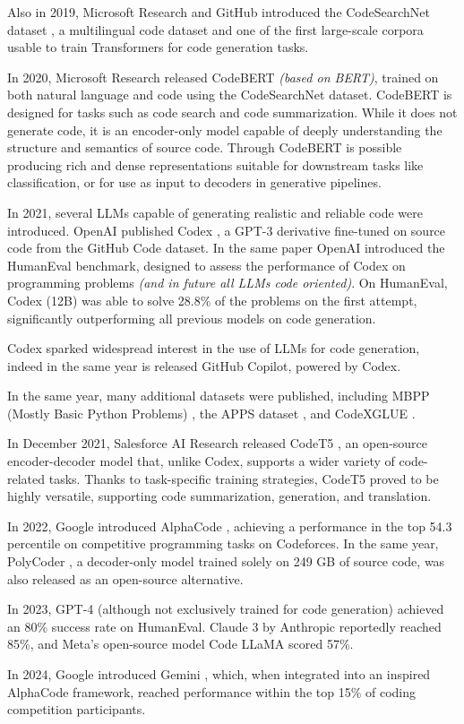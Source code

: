 Also in 2019, Microsoft Research and GitHub introduced the 
CodeSearchNet dataset \cite{husain2019codesearchnet}, a 
multilingual code dataset and one of the first large-scale 
corpora usable to train Transformers for code generation tasks.

In 2020, Microsoft Research released CodeBERT 
\cite{feng2020codebert} \textit{(based on BERT)}, 
trained on both natural 
language and code using the CodeSearchNet dataset. 
CodeBERT is designed for tasks such as code search 
and code summarization. While it does not generate code, 
it is an encoder-only model capable of deeply understanding 
the structure and semantics of source code. Through 
CodeBERT is possible producing rich 
and dense representations suitable for downstream tasks like 
classification, or for use as input to decoders in generative 
pipelines.

In 2021, several LLMs capable of generating realistic and 
reliable code were introduced. OpenAI published Codex 
\cite{chen2021codex}, a GPT-3 derivative fine-tuned on 
source code from the GitHub Code dataset. In the same paper 
OpenAI introduced the HumanEval benchmark, designed to assess the 
performance of Codex on programming problems 
\textit{(and in future all LLMs code oriented)}.
On HumanEval, Codex (12B) was able to solve 28.8\% 
of the problems on the 
first attempt, significantly outperforming all previous 
models on code generation.

Codex sparked widespread interest in the use of LLMs 
for code generation, indeed in the same year is released 
GitHub Copilot, powered by Codex.

In the same year, 
many additional datasets were 
published, including MBPP (Mostly Basic Python Problems) 
\cite{austin2021program}, the APPS dataset \cite{hendrycks2021measuring}, 
and CodeXGLUE \cite{lu2021codexglue}.

In December 2021, Salesforce AI Research released CodeT5 
\cite{wang2021codet5}, an open-source encoder-decoder 
model that, unlike Codex, supports a wider variety of 
code-related tasks. Thanks to task-specific training strategies, 
CodeT5 proved to be highly versatile, supporting code 
summarization, generation, and translation.

In 2022, Google introduced AlphaCode \cite{li2022competition}, 
achieving a performance in the top 54.3 percentile on 
competitive programming tasks on Codeforces. In the same 
year, PolyCoder \cite{xu2022systematic}, a decoder-only 
model trained solely on 249 GB of source code, was also 
released as an open-source alternative. 

In 2023, GPT-4 \cite{openai2023gpt4} (although not 
exclusively trained for code generation)  
achieved an 80\% success rate on HumanEval. 
Claude 3 by Anthropic reportedly reached 85\%, 
and Meta’s open-source model Code LLaMA 
\cite{roziere2023code} scored 57\%.

In 2024, Google introduced Gemini \cite{AlphaCode_2}, 
which, when integrated into an inspired AlphaCode framework, 
reached performance within the top 15\% of coding competition 
participants.
